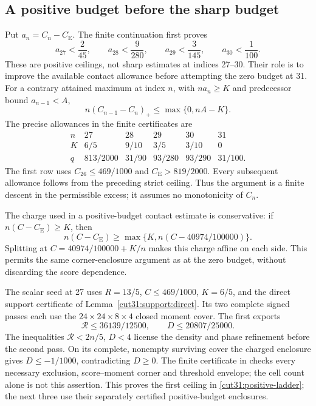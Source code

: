 \documentclass[11pt,a4paper]{article}
\numberwithin{equation}{section}
\theoremstyle{definition}
\theoremstyle{remark}
\newcommand{\CE}{C_{\mathrm E}}
\begin{document}
\subsection{A positive budget before the sharp budget}
Put \(a_n=C_n-\CE\). The finite continuation first proves
\begin{equation}\label{cut31:positive-ladder}
 a_{27}<\frac2{45},\qquad
 a_{28}<\frac9{280},\qquad
 a_{29}<\frac3{145},\qquad
 a_{30}<\frac1{100}.
\end{equation}
These are positive ceilings, not sharp estimates at indices
27--30. Their role is to improve the available contact allowance
before attempting the zero budget at 31.
For a contrary attained maximum at index \(n\), with
\(na_n\ge K\) and predecessor bound \(a_{n-1}<A\),
\[
 n(C_{n-1}-C_n)_+\le\max\{0,nA-K\}.
\]
The precise allowances in the finite certificates are
\[
\begin{array}{c|ccccc}
 n&27&28&29&30&31\\\hline
 K&6/5&9/10&3/5&3/10&0\\
 q&813/2000&31/90&93/280&93/290&31/100.
\end{array}
\]
The first row uses \(C_{26}\le469/1000\) and \(\CE>819/2000\).
Every subsequent allowance follows from the preceding strict
ceiling. Thus the argument is a finite descent in the permissible
excess; it assumes no monotonicity of \(C_n\).

The charge used in a positive-budget contact estimate is conservative:
if \(n(C-\CE)\ge K\), then
\[
 n(C-\CE)\ge\max\{K,n(C-40974/100000)\}.
\]
Splitting at \(C=40974/100000+K/n\) makes this charge affine
on each side. This permits the same corner-enclosure argument
as at the zero budget, without discarding the score dependence.

The scalar seed at 27 uses \(R=13/5\), \(C\le469/1000\),
\(K=6/5\), and the direct support certificate of
Lemma~\ref{cut31:support:direct}. Its two complete signed passes
each use the \(24\times24\times8\times4\) closed moment cover.
The first exports
\[
 \mathcal R\le36139/12500,\qquad D\le20807/25000.
\]
The inequalities \(\mathcal R<2n/5\), \(D<4\) license the
density and phase refinement before the second pass. On its complete,
nonempty surviving cover the charged enclosure gives
\(D\le-1/1000\), contradicting \(D\ge0\).
The finite certificate in \cite{EffectiveSupplement} checks every
necessary exclusion, score--moment corner and threshold envelope;
the cell count alone is not this assertion. This proves the first
ceiling in \eqref{cut31:positive-ladder}; the next three use their
separately certified positive-budget enclosures.
\end{document}
